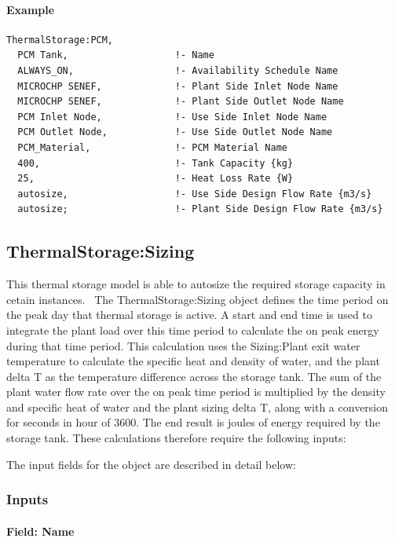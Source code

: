\paragraph{Example}\label{example-pcmstorage}
\begin{lstlisting}
ThermalStorage:PCM,
  PCM Tank,                   !- Name
  ALWAYS_ON,                  !- Availability Schedule Name
  MICROCHP SENEF,             !- Plant Side Inlet Node Name
  MICROCHP SENEF,             !- Plant Side Outlet Node Name
  PCM Inlet Node,             !- Use Side Inlet Node Name
  PCM Outlet Node,            !- Use Side Outlet Node Name
  PCM_Material,               !- PCM Material Name
  400,                        !- Tank Capacity {kg}
  25,                         !- Heat Loss Rate {W}
  autosize,                   !- Use Side Design Flow Rate {m3/s}
  autosize;                   !- Plant Side Design Flow Rate {m3/s}
\end{lstlisting}

\subsection{ThermalStorage:Sizing}\label{thermalstoragesizing}

This thermal storage model is able to autosize the required storage capacity in cetain instances.~
The ThermalStorage:Sizing object defines the time period on the peak day that thermal storage is active. A start and end time is used to integrate the plant load over this time period to calculate the on peak energy during that time period. This calculation uses the Sizing:Plant exit water temperature to calculate the specific heat and density of water, and the plant delta T as the temperature difference across the storage tank. The sum of the plant water flow rate over the on peak time period is multiplied by the density and specific heat of water and the plant sizing delta T, along with a conversion for seconds in hour of 3600. The end result is joules of energy required by the storage tank. These calculations therefore require the following inputs:

The input fields for the object are described in detail below:

\subsubsection{Inputs}\label{inputs-20-103}

\paragraph{Field: Name}\label{field-name-20-104}

